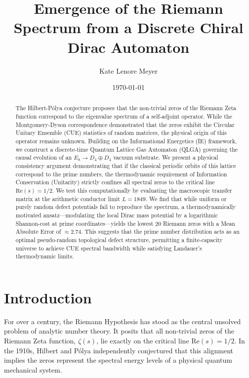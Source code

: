 \documentclass[11pt,aps,prd,twocolumn,nofootinbib,superscriptaddress]{revtex4-2}
\begin{document}
\title{Emergence of the Riemann Spectrum from a Discrete Chiral Dirac Automaton}

\author{Kate Lenore Meyer}
\date{\today}

\begin{abstract}
The Hilbert-P\'olya conjecture proposes that the non-trivial zeros of the Riemann Zeta function correspond to the eigenvalue spectrum of a self-adjoint operator. While the Montgomery-Dyson correspondence demonstrated that the zeros exhibit the Circular Unitary Ensemble (CUE) statistics of random matrices, the physical origin of this operator remains unknown. Building on the Informational Energetics (IE) framework, we construct a discrete-time Quantum Lattice Gas Automaton (QLGA) governing the causal evolution of an $E_8 \to D_4 \oplus D_4$ vacuum substrate. We present a physical consistency argument demonstrating that if the classical periodic orbits of this lattice correspond to the prime numbers, the thermodynamic requirement of Information Conservation (Unitarity) strictly confines all spectral zeros to the critical line $\text{Re}(s) = 1/2$. We test this computationally by evaluating the macroscopic transfer matrix at the arithmetic conductor limit $L=1849$. We find that while uniform or purely random defect potentials fail to reproduce the spectrum, a thermodynamically motivated ansatz—modulating the local Dirac mass potential by a logarithmic Shannon-cost at prime coordinates—yields the lowest 20 Riemann zeros with a Mean Absolute Error of $\approx 2.74$. This suggests that the prime number distribution acts as an optimal pseudo-random topological defect structure, permitting a finite-capacity universe to achieve CUE spectral bandwidth while satisfying Landauer's thermodynamic limits.
\end{abstract}

\maketitle

\section{Introduction}

For over a century, the Riemann Hypothesis has stood as the central unsolved problem of analytic number theory. It posits that all non-trivial zeros of the Riemann Zeta function, $\zeta(s)$, lie exactly on the critical line $\text{Re}(s) = 1/2$. In the 1910s, Hilbert and P\'olya independently conjectured that this alignment implies the zeros represent the spectral energy levels of a physical quantum mechanical system. 
\end{document}
